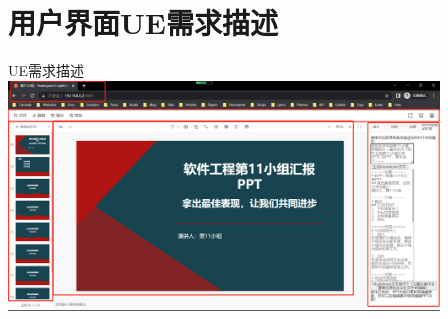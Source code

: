 \section{用户界面UE需求描述}
\begin{frame}{UE需求描述}
\center \includegraphics[width=4.5in]{contents/figure/UE_Demo.png}
\end{frame}